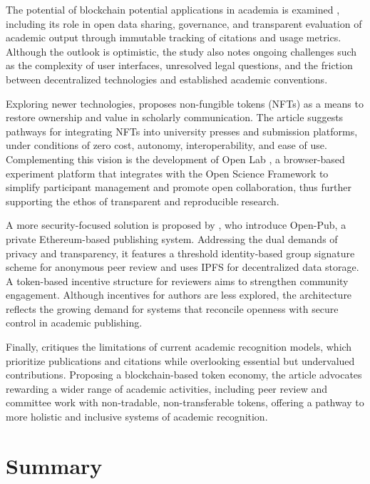 \documentclass[final]{rc-book-2.14}
\begin{document}
The potential of blockchain potential applications in academia is examined \cite{kosmarski_blockchain_2020}, including its role in open data sharing, governance, and transparent evaluation of academic output through immutable tracking of citations and usage metrics. Although the outlook is optimistic, the study also notes ongoing challenges such as the complexity of user interfaces, unresolved legal questions, and the friction between decentralized technologies and established academic conventions.

Exploring newer technologies, \cite{putnings_non-fungible_2022} proposes non-fungible tokens (NFTs) as a means to restore ownership and value in scholarly communication. The article suggests pathways for integrating NFTs into university presses and submission platforms, under conditions of zero cost, autonomy, interoperability, and ease of use. Complementing this vision is the development of Open Lab \cite{shevchenko_open_2022}, a browser-based experiment platform that integrates with the Open Science Framework to simplify participant management and promote open collaboration, thus further supporting the ethos of transparent and reproducible research.

A more security-focused solution is proposed by \cite{zhou_open-pub_2021}, who introduce Open-Pub, a private Ethereum-based publishing system. Addressing the dual demands of privacy and transparency, it features a threshold identity-based group signature scheme for anonymous peer review and uses IPFS for decentralized data storage. A token-based incentive structure for reviewers aims to strengthen community engagement. Although incentives for authors are less explored, the architecture reflects the growing demand for systems that reconcile openness with secure control in academic publishing.

Finally, \cite{lee_unblocking_2023} critiques the limitations of current academic recognition models, which prioritize publications and citations while overlooking essential but undervalued contributions. Proposing a blockchain-based token economy, the article advocates rewarding a wider range of academic activities,  including peer review and committee work with non-tradable, non-transferable tokens, offering a pathway to more holistic and inclusive systems of academic recognition.

\section{Summary}
\label{chp:review:sec:review:summary}
\end{document}
